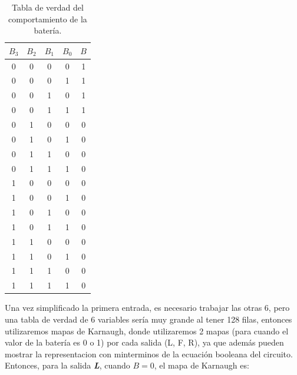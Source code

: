 \documentclass[a4paper]{article}
\begin{document}
\begin{table}[!htbp]
    \centering
    \begin{tabular}{cccc|c}
    $B_3$ & $B_2$ & $B_1$ & $B_0$ & $B$ \\ \hline
    0     & 0     & 0     & 0     & 1   \\
    0     & 0     & 0     & 1     & 1   \\
    0     & 0     & 1     & 0     & 1   \\
    0     & 0     & 1     & 1     & 1   \\
    0     & 1     & 0     & 0     & 0   \\
    0     & 1     & 0     & 1     & 0   \\
    0     & 1     & 1     & 0     & 0   \\
    0     & 1     & 1     & 1     & 0   \\
    1     & 0     & 0     & 0     & 0   \\
    1     & 0     & 0     & 1     & 0   \\
    1     & 0     & 1     & 0     & 0   \\
    1     & 0     & 1     & 1     & 0   \\
    1     & 1     & 0     & 0     & 0   \\
    1     & 1     & 0     & 1     & 0   \\
    1     & 1     & 1     & 0     & 0   \\
    1     & 1     & 1     & 1     & 0  
    \end{tabular}
    \caption{Tabla de verdad del comportamiento de la batería.}
    \label{tab1}
\end{table}

Una vez simplificado la primera entrada, es necesario trabajar las otras 6, pero una tabla de verdad de 6 variables sería muy grande al tener 128 filas, entonces utilizaremos mapas de Karnaugh, donde utilizaremos 2 mapas (para cuando el valor de la batería es 0 o 1) por cada salida (L, F, R), ya que además pueden mostrar la representacion con minterminos de la ecuación booleana del circuito.
\newpage
Entonces, para la salida \textbf{\textit{L}}, cuando $B = 0$, el mapa de Karnaugh es:

\end{document}
